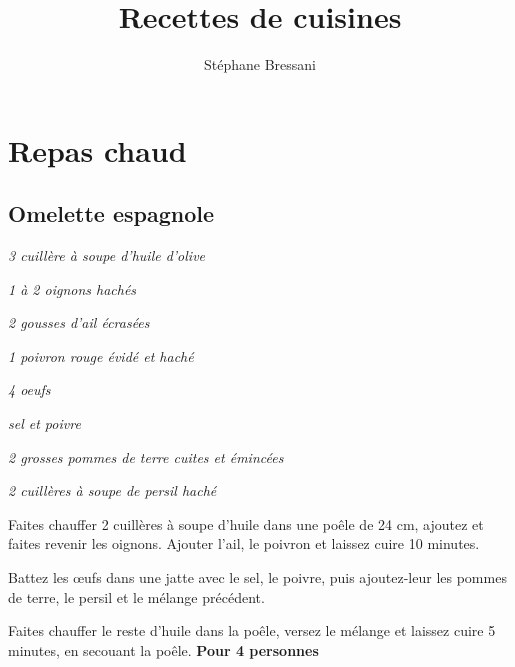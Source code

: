 \documentclass[10pt,a4paper]{report}
\author{Stéphane Bressani}
\title{Recettes de cuisines}
\begin{document}
    \maketitle
    \tableofcontents

    \chapter{Repas chaud}
    \newpage

    \section{Omelette espagnole}

    \begin{multicols}{2}
        \parbox[1cm]{\textwidth}{
            \begin{description}
                \item \textit{3 cuillère à soupe d'huile d'olive}
                \item \textit{1 à 2 oignons hachés}
                \item \textit{2 gousses d'ail écrasées}
                \item \textit{1 poivron rouge évidé et haché}
                \item \textit{4 oeufs}
                \item \textit{sel et poivre}
                \item \textit{2 grosses pommes de terre cuites et émincées}
                \item \textit{2 cuillères à soupe de persil haché}
            \end{description}
        }
        \columnbreak

        Faites chauffer 2 cuillères à soupe d'huile dans une poêle de 24 cm, ajoutez et faites revenir les oignons. Ajouter l'ail, le poivron et laissez cuire 10 minutes.
        \newline

        Battez les œufs dans une jatte avec le sel, le poivre, puis ajoutez-leur les pommes de terre, le persil et le mélange précédent.
        \newline

        Faites chauffer le reste d'huile dans la poêle, versez le mélange et laissez cuire 5 minutes, en secouant la poêle.
        \newline
        \newline
        \textbf{Pour 4 personnes}
    \end{multicols}
\end{document}
